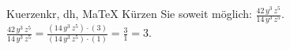 \begin{MAufgabe}{Kuerzen}{kr, dh, MaTeX}
K\"urzen Sie soweit m\"oglich: $\frac{42\, y^3\, z^5}{14\, y^3\, z^5}$.\\ 
\ifLsg\MLoesung
\quad $\frac{42\, y^3\, z^5}{14\, y^3\, z^5}=\frac{(14\, y^3\, z^5)\cdot(3)}{(14\, y^3\, z^5)\cdot(1)}=\frac{3}{1}=3$.\else\relax\fi
 \end{MAufgabe}